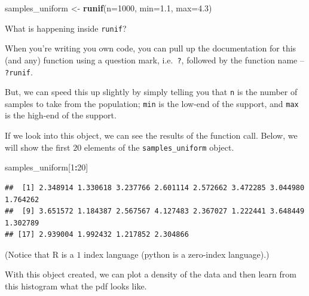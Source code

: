 \documentclass[
]{book}
\newenvironment{Shaded}{\begin{snugshade}}{\end{snugshade}}
\newcommand{\AttributeTok}[1]{\textcolor[rgb]{0.13,0.29,0.53}{#1}}
\newcommand{\DecValTok}[1]{\textcolor[rgb]{0.00,0.00,0.81}{#1}}
\newcommand{\FloatTok}[1]{\textcolor[rgb]{0.00,0.00,0.81}{#1}}
\newcommand{\FunctionTok}[1]{\textcolor[rgb]{0.13,0.29,0.53}{\textbf{#1}}}
\newcommand{\NormalTok}[1]{#1}
\newcommand{\OtherTok}[1]{\textcolor[rgb]{0.56,0.35,0.01}{#1}}
\newcommand{\SpecialCharTok}[1]{\textcolor[rgb]{0.81,0.36,0.00}{\textbf{#1}}}
\theoremstyle{definition}
\theoremstyle{definition}
\theoremstyle{definition}
\theoremstyle{definition}
\theoremstyle{remark}
\begin{document}
\begin{Shaded}
\begin{Highlighting}[]
\NormalTok{samples\_uniform }\OtherTok{\textless{}{-}} \FunctionTok{runif}\NormalTok{(}\AttributeTok{n=}\DecValTok{1000}\NormalTok{, }\AttributeTok{min=}\FloatTok{1.1}\NormalTok{, }\AttributeTok{max=}\FloatTok{4.3}\NormalTok{)}
\end{Highlighting}
\end{Shaded}

What is happening inside \texttt{runif}?

When you're writing you own code, you can pull up the documentation for this (and any) function using a question mark, i.e.~\texttt{?}, followed by the function name -- \texttt{?runif}.

But, we can speed this up slightly by simply telling you that \texttt{n} is the number of samples to take from the population; \texttt{min} is the low-end of the support, and \texttt{max} is the high-end of the support.

If we look into this object, we can see the results of the function call. Below, we will show the first \(20\) elements of the \texttt{samples\_uniform} object.

\begin{Shaded}
\begin{Highlighting}[]
\NormalTok{samples\_uniform[}\DecValTok{1}\SpecialCharTok{:}\DecValTok{20}\NormalTok{]}
\end{Highlighting}
\end{Shaded}

\begin{verbatim}
##  [1] 2.348914 1.330618 3.237766 2.601114 2.572662 3.472285 3.044980 1.764262
##  [9] 3.651572 1.184387 2.567567 4.127483 2.367027 1.222441 3.648449 1.302789
## [17] 2.939004 1.992432 1.217852 2.304866
\end{verbatim}

(Notice that R is a \(1\) index language (python is a zero-index language).)

With this object created, we can plot a density of the data and then learn from this histogram what the pdf looks like.
\end{document}
